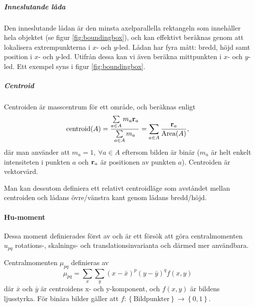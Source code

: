 \documentclass[../rapport_MVEX01-11-05]{subfiles}
\begin{document}
\subparagraph{Inneslutande låda}

Den inneslutande lådan är den minsta axelparallella rektangeln som innehåller hela
objektet (se figur \ref{fig:boundingbox}),
och kan effektivt beräknas genom att lokalisera
extrempunkterna i $x$- och $y$-led. Lådan har fyra mått: bredd, höjd samt
position i $x$- och $y$-led. Utifrån dessa kan vi även beräkna
mittpunkten i $x$- och $y$-led. Ett exempel syns i figur \ref{fig:boundingbox}.

\subparagraph{Centroid}

Centroiden är masscentrum för ett område, och beräknas enligt
\begin{equation*}
  \textrm{centroid}(A) = \frac{
    \sum\limits_{a\in A}m_a\mathbf{r}_a
  }{
    \sum\limits_{a\in A}m_a
  } =
  \sum\limits_{a\in
  A}\frac{\mathbf{r}_a}{\textrm{Area}(A)},
\end{equation*}
där man använder att $m_a=1,\:\forall a\in A$ eftersom bilden är
binär ($m_a$ är helt enkelt intensiteten i punkten $a$ och
$\mathbf{r}_a$ är positionen av punkten $a$). Centroiden är vektorvärd.

Man kan dessutom definiera ett relativt centroidläge  som avståndet mellan 
centroiden och lådans övre/vänstra kant genom lådans bredd/höjd.

\paragraph{Hu-moment}

Dessa moment definierades först av  och är ett försök att
göra centralmomenten $u_{pq}$ rotations-, skalnings- och translationsinvarianta och
därmed mer användbara. 

Centralmomenten $\mu_{pq}$ definieras av
\begin{equation*}
	\mu_{pq} = \sum\limits_x\sum\limits_y
	           \left(x-\bar{x}\right)^p
	           \left(y-\bar{y}\right)^q
	           f(x,y)
\end{equation*}
där $\bar{x}$ och $\bar{y}$ är centroidens x- och y-komponent, och $f(x,y)$ är
bildens ljusstyrka. För binära bilder gäller att
$f:\left\{\text{Bildpunkter}\right\}\rightarrow\left\{0,1\right\}$.
\end{document}
